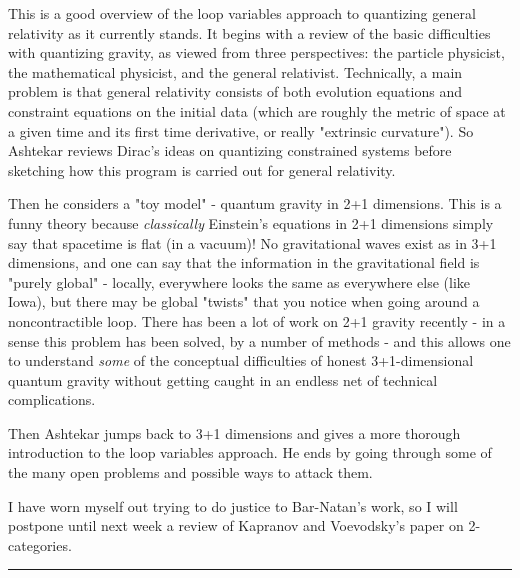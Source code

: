 This is a good overview of the loop variables approach to quantizing
general relativity as it currently stands.   It begins with a review of
the basic difficulties with quantizing gravity, as viewed from three
perspectives: the particle physicist, the mathematical physicist, and
the general relativist.  Technically, a main problem is that general
relativity consists of both evolution equations and constraint equations
on the initial data (which are roughly the metric of space at a given
time and its first time derivative, or really "extrinsic curvature").  
So Ashtekar reviews Dirac's ideas on quantizing constrained systems
before sketching how this program is carried out for general relativity.

Then he considers a "toy model" - quantum gravity in 2+1 dimensions.
This is a funny theory because \emph{classically} Einstein's equations in 2+1
dimensions simply say that spacetime is flat (in a vacuum)!  No
gravitational waves exist as in 3+1 dimensions, and one can say that the
information in the gravitational field is "purely global" - locally,
everywhere looks the same as everywhere else (like Iowa), but there may
be global "twists" that you notice when going around a noncontractible loop.
There has been a lot of work on 2+1 gravity recently - in a sense this problem
has been solved, by a number of methods - and this allows one to
understand \emph{some} of the conceptual difficulties of honest
3+1-dimensional quantum gravity without getting caught in an endless net
of technical complications.  

Then Ashtekar jumps back to 3+1 dimensions and gives a more thorough
introduction to the loop variables approach.  He ends by going through
some of the many open problems and possible ways to attack them.  


I have worn myself out trying to do justice to Bar-Natan's work, so I
will postpone until next week a review of Kapranov and Voevodsky's paper
on 2-categories.  
\par\noindent\rule{\textwidth}{0.4pt}

